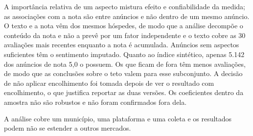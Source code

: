 A importância relativa de um aspecto mistura efeito e confiabilidade da medida; as associações com a nota são entre anúncios e não dentro de um mesmo anúncio. O texto e a nota vêm dos mesmos hóspedes, de modo que a análise decompõe o conteúdo da nota e não a prevê por um fator independente e o texto cobre as 30 avaliações mais recentes enquanto a nota é acumulada. Anúncios sem aspectos suficientes têm o sentimento imputado. Quanto ao índice sintético, apenas 5.142 dos anúncios de nota 5,0 o possuem. Os que ficam de fora têm menos avaliações, de modo que as conclusões sobre o teto valem para esse subconjunto. A decisão de não aplicar encolhimento foi tomada depois de ver o resultado com encolhimento, o que justifica reportar as duas versões. Os coeficientes dentro da amostra não são robustos e não foram confirmados fora dela.

A análise cobre um município, uma plataforma e uma coleta e os resultados podem não se estender a outros mercados.
